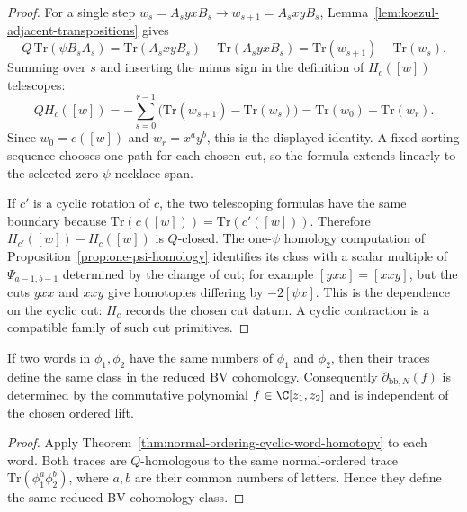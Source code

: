 \documentclass[11pt]{memoir}
\begin{document}
\begin{proof}
  For a single step \(w_s=A_syxB_s\to w_{s+1}=A_sxyB_s\),
  Lemma~\ref{lem:koszul-adjacent-transpositions} gives
  \[
    Q\,\mathrm{Tr}(\psi B_sA_s)
      =\mathrm{Tr}(A_sxyB_s)-\mathrm{Tr}(A_syxB_s)
      =\mathrm{Tr}(w_{s+1})-\mathrm{Tr}(w_s).
  \]
  Summing over \(s\) and inserting the minus sign in the definition of
  \(H_c([w])\) telescopes:
  \[
    QH_c([w])
      =-\sum_{s=0}^{r-1}
        \bigl(\mathrm{Tr}(w_{s+1})-\mathrm{Tr}(w_s)\bigr)
      =\mathrm{Tr}(w_0)-\mathrm{Tr}(w_r).
  \]
  Since \(w_0=c([w])\) and \(w_r=x^ay^b\), this is the displayed identity.
  A fixed sorting sequence chooses one path for each chosen cut, so the
  formula extends linearly to the selected zero-\(\psi\) necklace span.

  If \(c'\) is a cyclic rotation of \(c\), the two telescoping formulas have
  the same boundary because \(\mathrm{Tr}(c([w]))=\mathrm{Tr}(c'([w]))\).
  Therefore \(H_{c'}([w])-H_c([w])\) is \(Q\)-closed.  The one-\(\psi\)
  homology computation of Proposition~\ref{prop:one-psi-homology} identifies
  its class with a scalar multiple of
  \(\Psi_{a-1,b-1}\) determined by the change of cut; for example \([yxx]=[xxy]\), but the cuts \(yxx\)
  and \(xxy\) give homotopies differing by \(-2[\psi x]\).  This is the
  dependence on the cyclic cut: \(H_c\) records the chosen cut datum.  A cyclic
  contraction is a compatible family of such cut primitives.
\end{proof}

\begin{cor}\label{cor:matrix-evaluation-well-defined}
  If two words in $\phi_1,\phi_2$ have the same numbers of $\phi_1$ and
  $\phi_2$, then their traces define the same class in the reduced BV
  cohomology. Consequently $\partial_{\mathrm{bb},N}(f)$ is determined by the
  commutative polynomial $f\in\C[z_1,z_2]$ and is independent of the chosen
  ordered lift.
\end{cor}

\begin{proof}
  Apply Theorem~\ref{thm:normal-ordering-cyclic-word-homotopy} to each
  word.  Both traces are \(Q\)-homologous to the same normal-ordered trace
  \(\mathrm{Tr}(\phi_1^a\phi_2^b)\), where \(a,b\) are their common numbers
  of letters.  Hence they define the same reduced BV cohomology class.
\end{proof}
\end{document}
